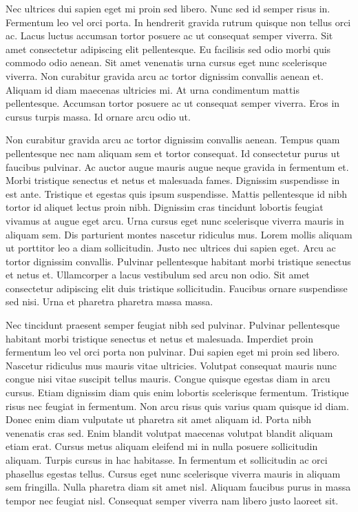\documentclass[11pt,a4paper]{article}
\begin{document}
Nec ultrices dui sapien eget mi proin sed libero. Nunc sed id semper risus in. Fermentum leo vel orci porta. In hendrerit gravida rutrum quisque non tellus orci ac. Lacus luctus accumsan tortor posuere ac ut consequat semper viverra. Sit amet consectetur adipiscing elit pellentesque. Eu facilisis sed odio morbi quis commodo odio aenean. Sit amet venenatis urna cursus eget nunc scelerisque viverra. Non curabitur gravida arcu ac tortor dignissim convallis aenean et. Aliquam id diam maecenas ultricies mi. At urna condimentum mattis pellentesque. Accumsan tortor posuere ac ut consequat semper viverra. Eros in cursus turpis massa. Id ornare arcu odio ut.

Non curabitur gravida arcu ac tortor dignissim convallis aenean. Tempus quam pellentesque nec nam aliquam sem et tortor consequat. Id consectetur purus ut faucibus pulvinar. Ac auctor augue mauris augue neque gravida in fermentum et. Morbi tristique senectus et netus et malesuada fames. Dignissim suspendisse in est ante. Tristique et egestas quis ipsum suspendisse. Mattis pellentesque id nibh tortor id aliquet lectus proin nibh. Dignissim cras tincidunt lobortis feugiat vivamus at augue eget arcu. Urna cursus eget nunc scelerisque viverra mauris in aliquam sem. Dis parturient montes nascetur ridiculus mus. Lorem mollis aliquam ut porttitor leo a diam sollicitudin. Justo nec ultrices dui sapien eget. Arcu ac tortor dignissim convallis. Pulvinar pellentesque habitant morbi tristique senectus et netus et. Ullamcorper a lacus vestibulum sed arcu non odio. Sit amet consectetur adipiscing elit duis tristique sollicitudin. Faucibus ornare suspendisse sed nisi. Urna et pharetra pharetra massa massa.

Nec tincidunt praesent semper feugiat nibh sed pulvinar. Pulvinar pellentesque habitant morbi tristique senectus et netus et malesuada. Imperdiet proin fermentum leo vel orci porta non pulvinar. Dui sapien eget mi proin sed libero. Nascetur ridiculus mus mauris vitae ultricies. Volutpat consequat mauris nunc congue nisi vitae suscipit tellus mauris. Congue quisque egestas diam in arcu cursus. Etiam dignissim diam quis enim lobortis scelerisque fermentum. Tristique risus nec feugiat in fermentum. Non arcu risus quis varius quam quisque id diam. Donec enim diam vulputate ut pharetra sit amet aliquam id. Porta nibh venenatis cras sed. Enim blandit volutpat maecenas volutpat blandit aliquam etiam erat. Cursus metus aliquam eleifend mi in nulla posuere sollicitudin aliquam. Turpis cursus in hac habitasse. In fermentum et sollicitudin ac orci phasellus egestas tellus. Cursus eget nunc scelerisque viverra mauris in aliquam sem fringilla. Nulla pharetra diam sit amet nisl. Aliquam faucibus purus in massa tempor nec feugiat nisl. Consequat semper viverra nam libero justo laoreet sit.
\end{document}
